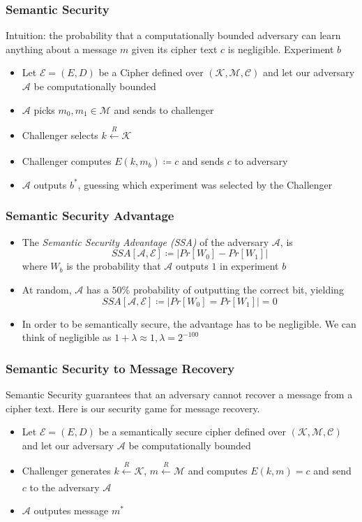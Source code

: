 \documentclass{beamer}
\begin{document}
\begin{frame}
\frametitle{Semantic Security}
    Intuition: the probability that a computationally bounded adversary can learn anything about a message \(m\) given its cipher text \(c\) is negligible. \pause
    Experiment \(b\)
    \begin{itemize}
        \item Let \(\mathcal{E} = (E, D)\) be a Cipher defined over \((\mathcal{K}, \mathcal{M}, \mathcal{C})\) and let our adversary \(\mathcal{A}\) be computationally bounded \pause
        \item \(\mathcal{A}\) picks \(m_0, m_1 \in \mathcal{M}\) and sends to challenger \pause
        \item Challenger selects \(k \xleftarrow[]{R} \mathcal{K}\) \pause
        \item Challenger computes \(E(k, m_b) \coloneqq c \) and sends \(c\) to adversary \pause
        \item \(\mathcal{A}\) outputs \(b^{*}\), guessing which experiment was selected by the Challenger
    \end{itemize}
\end{frame}

\begin{frame}
\frametitle{Semantic Security Advantage}
    \begin{itemize}
        \item The \textit{Semantic Security Advantage (SSA)} of the adversary \(\mathcal{A}\), is \pause \[ SSA[\mathcal{A}, \mathcal{E}] \coloneqq |Pr[W_0] - Pr[W_1]| \] where \(W_b\) is the probability that \(\mathcal{A}\) outputs \(1\) in experiment \(b\) \pause
        \item At random, \(\mathcal{A}\) has a \(50\%\) probability of outputting the correct bit, yielding \[  SSA[\mathcal{A}, \mathcal{E}] \coloneqq |Pr[W_0] = Pr[W_1]| = 0 \] \pause
        \item In order to be semantically secure, the advantage has to be negligible. We can think of negligible as \( 1 + \lambda \approx 1, \lambda = 2^{-100}\) 
    \end{itemize} 
\end{frame}

\begin{frame}
\frametitle{Semantic Security to Message Recovery}
    Semantic Security guarantees that an adversary cannot recover a message from a cipher text. \pause
    Here is our security game for message recovery. \pause
    \begin{itemize}
        \item Let \(\mathcal{E} = (E, D)\) be a semantically secure cipher defined over \((\mathcal{K}, \mathcal{M}, \mathcal{C})\) and let our adversary \(\mathcal{A}\) be computationally bounded \pause
        \item Challenger generates \(k \xleftarrow[]{R} \mathcal{K}\), \(m \xleftarrow[]{R} \mathcal{M}\) and computes \(E(k, m) = c\) and send \(c\) to the adversary \(\mathcal{A}\) \pause
        \item \(\mathcal{A}\) outputes message \(m^{*}\) \pause
    \end{itemize} 
\end{frame}
\end{document}
